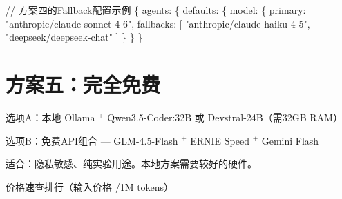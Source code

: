 \documentclass[
  10
]{article}
\newenvironment{Shaded}{}{}
\newcommand{\NormalTok}[1]{#1}
\begin{document}
\begin{Shaded}
\begin{Highlighting}[]
\NormalTok{// 方案四的Fallback配置示例  }
\NormalTok{\{  }
\NormalTok{agents: \{  }
\NormalTok{    defaults: \{  }
\NormalTok{        model: \{  }
\NormalTok{            primary: "anthropic/claude{-}sonnet{-}4{-}6",  }
\NormalTok{            fallbacks: [  }
\NormalTok{                "anthropic/claude{-}haiku{-}4{-}5",  }
\NormalTok{                "deepseek/deepseek{-}chat"  }
\NormalTok{            ]  }
\NormalTok{        \}  }
\NormalTok{    \}  }
\NormalTok{\}}
\end{Highlighting}
\end{Shaded}

\section{方案五：完全免费}\label{ux65b9ux6848ux4e94ux5b8cux5168ux514dux8d39}

选项A：本地 Ollama \(^ +\) Qwen3.5-Coder:32B 或 Devstral-24B（需32GB
RAM）

选项B：免费API组合 --- GLM-4.5-Flash \(^ +\) ERNIE Speed \(^ +\) Gemini
Flash

适合：隐私敏感、纯实验用途。本地方案需要较好的硬件。

价格速查排行（输入价格 /1M tokens）
\end{document}
